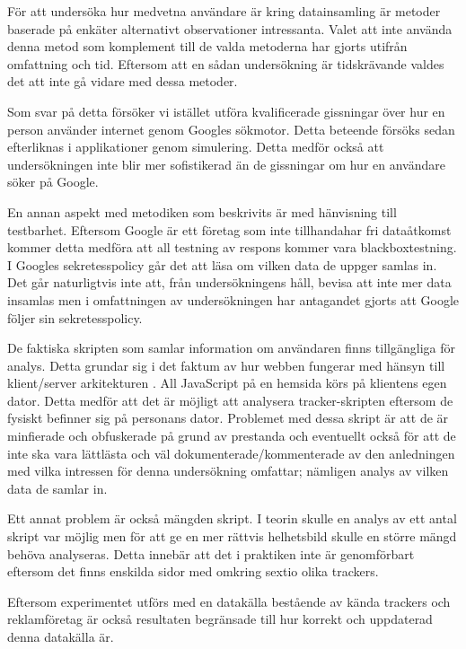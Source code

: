 \documentclass[a4paper,11pt]{article}
\begin{document}
{För att undersöka hur medvetna användare är kring datainsamling är metoder baserade på enkäter alternativt observationer intressanta. Valet att inte använda denna metod som komplement till de valda metoderna har gjorts utifrån omfattning och tid. Eftersom att en sådan undersökning är tidskrävande valdes det att inte gå vidare med dessa metoder.

Som svar på detta försöker vi istället utföra kvalificerade gissningar över hur en person använder internet genom Googles sökmotor. Detta beteende försöks sedan efterliknas i applikationer genom simulering. Detta medför också att undersökningen inte blir mer sofistikerad än de gissningar om hur en användare söker på Google. 

En annan aspekt med metodiken som beskrivits är med hänvisning till testbarhet. Eftersom Google är ett företag som inte tillhandahar fri dataåtkomst kommer detta medföra att all testning av respons kommer vara blackboxtestning. I Googles sekretesspolicy \cite{GooglePrivacyPolicy} går det att läsa om vilken data de uppger samlas in. Det går naturligtvis inte att, från undersökningens håll, bevisa att inte mer data insamlas men i omfattningen av undersökningen har antagandet gjorts att Google följer sin sekretesspolicy.

De faktiska skripten som samlar information om användaren finns tillgängliga för analys. Detta grundar sig i det faktum av hur webben fungerar med hänsyn till klient/server arkitekturen \cite{Dale}. All JavaScript på en hemsida körs på klientens egen dator. Detta medför att det är möjligt att analysera tracker-skripten eftersom de fysiskt befinner sig på personans dator. Problemet med dessa skript är att de är minfierade och obfuskerade på grund av prestanda och eventuellt också för att de inte ska vara lättlästa och väl dokumenterade/kommenterade av den anledningen med vilka intressen för denna undersökning omfattar; nämligen analys av vilken data de samlar in. 

Ett annat problem är också mängden skript. I teorin skulle en analys av ett antal skript var möjlig men för att ge en mer rättvis helhetsbild skulle en större mängd behöva analyseras. Detta innebär att det i praktiken inte är genomförbart eftersom det finns  enskilda sidor med omkring sextio olika trackers.

Eftersom experimentet utförs med en datakälla bestående av kända trackers och reklamföretag är också resultaten begränsade till hur korrekt och uppdaterad denna datakälla är.

}
\end{document}
